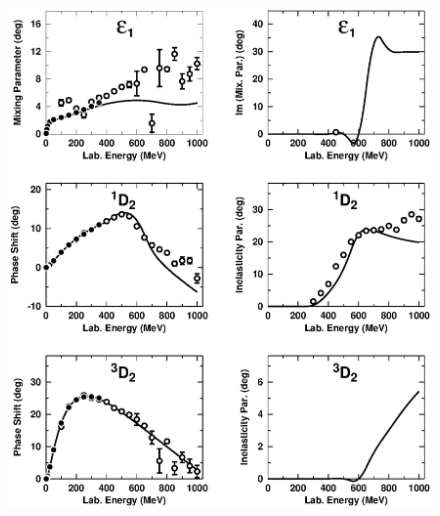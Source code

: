 \begin{figure}%
\begin{flushleft}
\includegraphics[height=20cm,width=18cm]{figd85_alt3.ps}
\end{flushleft}
\end{figure}

